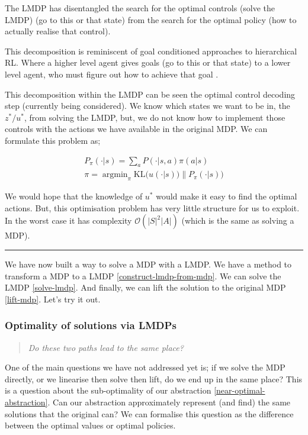 The LMDP has disentangled the search for the optimal controls (solve the LMDP) (go to this or
that state) from the search for the optimal policy (how to actually
realise that control).

This decomposition is reminiscent of goal conditioned approaches to hierarchical RL.
Where a higher level agent gives goals (go to this or that state) to a lower level
agent, who must figure out how to achieve that goal \cite{Vezhnevets2017}.

This decomposition within the LMDP can be seen the optimal control decoding
step (currently being considered). We know which
states we want to be in, the $z^{* } / u^{* }$, from solving the LMDP, but,
we do not know how to implement those controls with the actions we have available in the original MDP.
We can formulate this problem as;

\begin{align}
P_{\pi}(\cdot | s) = \sum_a P(\cdot | s, a) \pi(a | s) \\
\pi = \mathop{\text{argmin}}_{\pi} \text{KL}\Big(u(\cdot | s))\parallel P_{\pi}(\cdot | s)\Big)
\end{align}

We would hope that the knowledge of $u^{* }$ would make it easy to find the optimal actions.
But, this optimisation problem has very little structure for us to exploit.
In the worst case it has complexity $\mathcal O(|S|^2|A|)$ (which is the same as solving a MDP).

\begin{center}\rule{0.5\linewidth}{\linethickness}\end{center}

We have now built a way to solve a MDP with a LMDP.
We have a method to transform a MDP to a LMDP \ref{construct-lmdp-from-mdp}.
We can solve the LMDP \ref{solve-lmdp}.
And finally, we can lift the solution to the original MDP \ref{lift-mdp}.
Let's try it out.

\subsubsection{Optimality of solutions via LMDPs}\label{paths}

\begin{quote}
\textsl{Do these two paths lead to the same place?}
\end{quote}

One of the main questions we have not addressed yet is; if we solve the
MDP directly, or we linearise then solve then lift, do we end up in the same
place? This is a question about the sub-optimality of our abstraction \ref{near-optimal-abstraction}. Can
our abstraction approximately represent (and find) the same solutions that the
original can? We can formalise this question as the difference between the optimal values or optimal policies.

